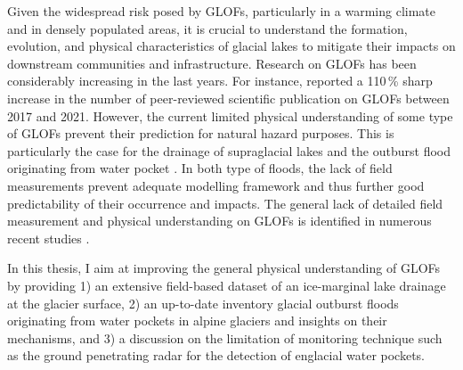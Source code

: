 Given the widespread risk posed by GLOFs, particularly in a warming climate and in densely populated areas, it is crucial to understand the formation, evolution, and physical characteristics of glacial lakes to mitigate their impacts on downstream communities and infrastructure. Research on GLOFs has been considerably increasing in the last years. For instance, \cite{Emmer&al2022} reported a 110\,\% sharp increase in the number of peer-reviewed scientific publication on GLOFs between 2017 and 2021. However, the current limited physical understanding of some type of GLOFs prevent their prediction for natural hazard purposes. This is particularly the case for the drainage of supraglacial lakes \citep[e.g.][]{Vincent&al2010} and the outburst flood originating from water pocket \citep[e.g.][]{Haeberli1983}. In both type of floods, the lack of field measurements prevent adequate modelling framework and thus further good predictability of their occurrence and impacts. The general lack of detailed field measurement and physical understanding on GLOFs is identified in numerous recent studies \citep{Zhang&al2024, Carrivick&Tweed2016, Veh&al2022}.

In this thesis, I aim at improving the general physical understanding of GLOFs by providing 1) an extensive field-based dataset of an ice-marginal lake drainage at the glacier surface, 2) an up-to-date inventory glacial outburst floods originating from water pockets in alpine glaciers and insights on their mechanisms, and 3) a discussion on the limitation of monitoring technique such as the ground penetrating radar for the detection of englacial water pockets. 


